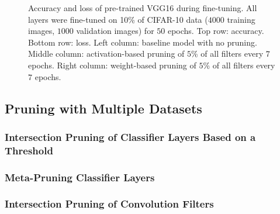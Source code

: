 \documentclass{article}
\begin{document}
\begin{figure}[!t]
{	}
	\caption{Accuracy and loss of pre-trained VGG16 during fine-tuning. All layers were fine-tuned on 10\% of CIFAR-10 data ($4000$ training images, $1000$ validation images) for $50$ epochs. Top row: accuracy. Bottom row: loss. Left column: baseline model with no pruning. Middle column: activation-based pruning of $5$\% of all filters every $7$ epochs. Right column: weight-based pruning of $5$\% of all filters every $7$ epochs.}
	\label{pruneFiltersSingle}
\end{figure}


%	
%	
%	

\subsection{Pruning with Multiple Datasets}

\subsubsection{Intersection Pruning of Classifier Layers Based on a Threshold}


\subsubsection{Meta-Pruning Classifier Layers}


\subsubsection{Intersection Pruning of Convolution Filters}
\end{document}
